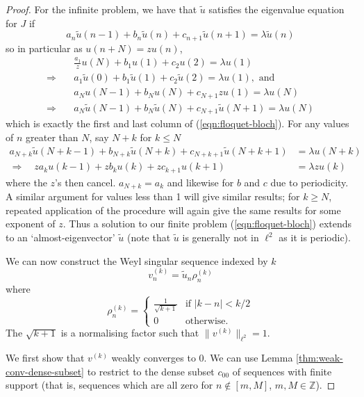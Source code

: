 \documentclass[../main.tex]{subfiles}
\begin{document}
\begin{proof} For the infinite problem, we have that $\tilde{u}$ satisfies
  the eigenvalue equation for $J$ if
  $$a_n \tilde{u}(n-1) + b_n \tilde{u}(n) + c_{n+1} \tilde{u}(n+1) = \lambda \tilde{u}(n)$$
so in particular as $u(n + N) = z u(n)$, 
\begin{align*}
  & \frac{a_1}{z} u(N) + b_1 u(1) + c_2 u(2) = \lambda u(1)\\
  \Rightarrow \quad& a_1 \tilde{u}(0) + b_1 \tilde{u}(1) + c_2 \tilde{u}(2) 
	    = \lambda u(1), \text{ and } \\
  & a_N u(N-1) + b_N u(N) + c_{N+1} z u(1) = \lambda u(N)\\
  \Rightarrow \quad& a_N \tilde{u}(N-1) + b_N \tilde{u}(N) + c_{N+1} \tilde{u}(N+1) 
            = \lambda u(N)
\end{align*}
which is exactly the first and last column of (\ref{eqn:floquet-bloch}). For any values of
$n$ greater than $N$, say $N + k$ for $k \leq N$ 
\begin{align*}
  a_{N+k} \tilde{u}(N+k-1) + b_{N+k} \tilde{u}(N+k) + c_{N+k+1} \tilde{u}(N+k+1)
    & = \lambda u(N+k) \\
  \Rightarrow \quad z a_{k} u(k-1) + z b_{k} u(k) + z c_{k+1} u(k+1) & = \lambda z u(k)
\end{align*} 
where the $z$'s then cancel. $a_{N+k} = a_{k}$ and likewise for $b$ and $c$ due to periodicity.
A similar argument for values less than 1 will give similar results; for $k \geq N$, repeated
application of the procedure will again give the same results for some exponent of $z$.
Thus a solution to our finite problem (\ref{eqn:floquet-bloch}) extends to an `almost-eigenvector'
$\tilde{u}$ (note that $\tilde{u}$ is generally not in $\ell^2$ as it is periodic).

We can now construct the Weyl singular sequence indexed by $k$
  $$v_n^{(k)} = {\tilde{u}_n} \rho_n^{(k)}$$
where 
  $$
  \rho_n^{(k)} =
  \begin{cases}
    \frac{1}{\sqrt{k+1}} & \text{if } |k-n| < k/2 \\
    0 & \text{otherwise.}
  \end{cases}
  $$
  The $\sqrt{k+1}$ is a normalising factor such that $\|v^{(k)}\|_{\ell^2} = 1$.

We first show that $v^{(k)}$ weakly converges to 0. We can use Lemma
\ref{thm:weak-conv-dense-subset} to restrict to the dense subset
$c_{00}$ of sequences with finite support (that is, sequences which are
all zero for $n \notin [m, M]$, $m, M \in \mathbb{Z}$).


\end{proof}
\end{document}
